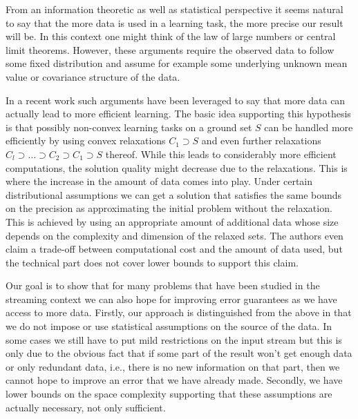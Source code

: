 \documentclass[a4paper,11pt,oneside,english,onecolumn]{article}
\theoremstyle{definition}
\begin{document}
From an information theoretic as well as statistical perspective it seems natural to say that the more data is used in a learning task, the more precise our result will be. In this context one might think of the law of large numbers or central limit theorems. However, these arguments require the observed data to follow some fixed distribution and assume for example some underlying unknown mean value or covariance structure of the data.

In a recent work \cite{MichaelJordan2013} such arguments have been leveraged to say that more data can actually lead to more efficient learning. The basic idea supporting this hypothesis is that possibly non-convex learning tasks on a ground set $S$ can be handled more efficiently by using convex relaxations $C_1\supset S$ and even further relaxations $C_l\supset\ldots\supset C_2\supset C_1 \supset S$ thereof. While this leads to considerably more efficient computations, the solution quality might decrease due to the relaxations. This is where the increase in the amount of data comes into play. Under certain distributional assumptions we can get a solution that satisfies the same bounds on the precision as approximating the initial problem without the relaxation. This is achieved by using an appropriate amount of additional data whose size depends on the complexity and dimension of the relaxed sets. The authors even claim a trade-off between computational cost and the amount of data used, but the technical part does not cover lower bounds to support this claim.

Our goal is to show that for many problems that have been studied in the streaming context we can also hope for improving error guarantees as we have access to more data. Firstly, our approach is distinguished from the above in that we do not impose or use statistical assumptions on the source of the data. In some cases we still have to put mild restrictions on the input stream but this is only due to the obvious fact that if some part of the result won't get enough data or only redundant data, i.e., there is no new information on that part, then we cannot hope to improve an error that we have already made. Secondly, we have lower bounds on the space complexity supporting that these assumptions are actually necessary, not only sufficient.
\end{document}
